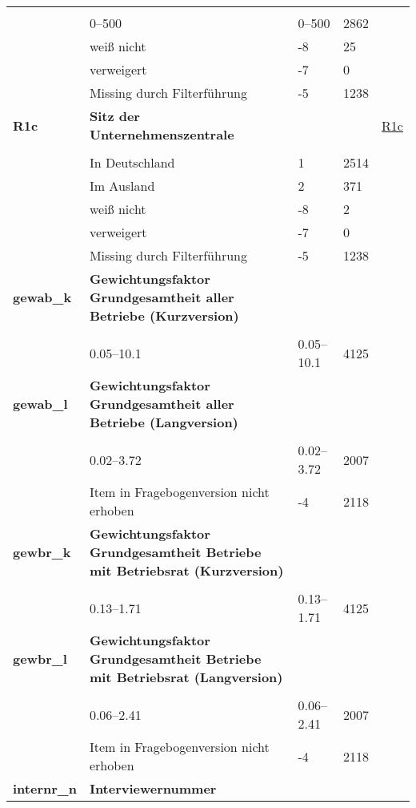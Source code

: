 \begin{longtable}{| L{2.5cm} | L{8.25cm}| C{1.5cm} | R{1.25cm} | C{2.25cm} |  }
   &  &  &  &  \\ 
   & 0--500 & 0--500 & 2862 &  \\ 
   & weiß nicht & -8 & 25 &  \\ 
   & verweigert & -7 & 0 &  \\ 
   & Missing durch Filterführung & -5 & 1238 &  \\ 
   \midrule
\textbf{R1c}\label{var:suf:R1c} & \textbf{Sitz der Unternehmenszentrale} &  &  & \hyperref[R1c]{R1c} \\ 
   &  &  &  &  \\ 
   & In Deutschland & 1 & 2514 &  \\ 
   & Im Ausland & 2 & 371 &  \\ 
   & weiß nicht & -8 & 2 &  \\ 
   & verweigert & -7 & 0 &  \\ 
   & Missing durch Filterführung & -5 & 1238 &  \\ 
   \midrule
\textbf{gewab\_k}\label{var:suf:gewab:k} & \textbf{Gewichtungsfaktor Grundgesamtheit aller Betriebe (Kurzversion)} &  &  &  \\ 
   &  &  &  &  \\ 
   & 0.05--10.1 & 0.05--10.1 & 4125 &  \\ 
   \midrule
\textbf{gewab\_l}\label{var:suf:gewab:l} & \textbf{Gewichtungsfaktor Grundgesamtheit aller Betriebe (Langversion)} &  &  &  \\ 
   &  &  &  &  \\ 
   & 0.02--3.72 & 0.02--3.72 & 2007 &  \\ 
   & Item in Fragebogenversion nicht erhoben & -4 & 2118 &  \\ 
   \midrule
\textbf{gewbr\_k}\label{var:suf:gewbr:k} & \textbf{Gewichtungsfaktor Grundgesamtheit Betriebe mit Betriebsrat (Kurzversion)} &  &  &  \\ 
   &  &  &  &  \\ 
   & 0.13--1.71 & 0.13--1.71 & 4125 &  \\ 
   \midrule
\textbf{gewbr\_l}\label{var:suf:gewbr:l} & \textbf{Gewichtungsfaktor Grundgesamtheit Betriebe mit Betriebsrat (Langversion)} &  &  &  \\ 
   &  &  &  &  \\ 
   & 0.06--2.41 & 0.06--2.41 & 2007 &  \\ 
   & Item in Fragebogenversion nicht erhoben & -4 & 2118 &  \\ 
   \midrule
\textbf{internr\_n}\label{var:suf:internr:n} & \textbf{Interviewernummer} &  &  &  \\ 

\end{longtable}
